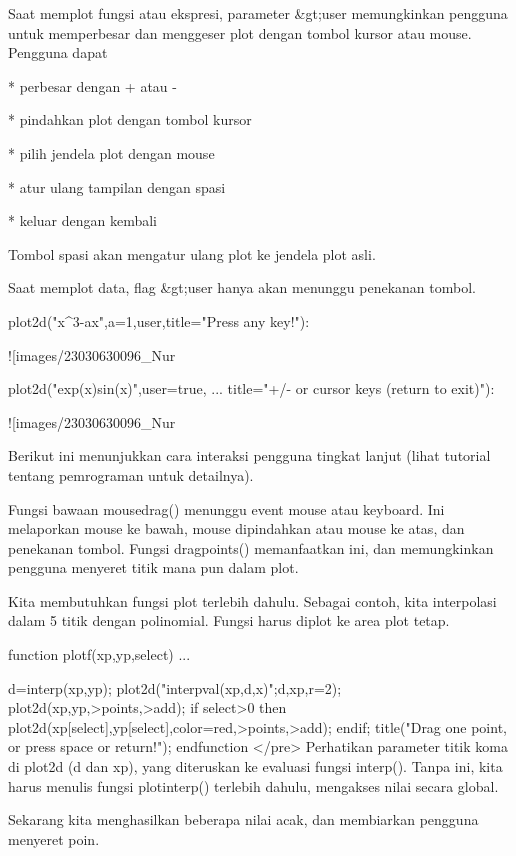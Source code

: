 \documentclass{article}
\begin{document}
Saat memplot fungsi atau ekspresi, parameter &gt;user memungkinkan
pengguna untuk memperbesar dan menggeser plot dengan tombol kursor
atau mouse. Pengguna dapat


* 
perbesar dengan + atau -

* 
pindahkan plot dengan tombol kursor

* 
pilih jendela plot dengan mouse

* 
atur ulang tampilan dengan spasi

* 
keluar dengan kembali


Tombol spasi akan mengatur ulang plot ke jendela plot asli.


Saat memplot data, flag &gt;user hanya akan menunggu penekanan tombol.


\>plot2d({{"x^3-a\*x",a=1}},\>user,title="Press any key!"):


![images/23030630096_Nur%

\>plot2d("exp(x)\*sin(x)",user=true, ...  
\>     title="+/- or cursor keys (return to exit)"):


![images/23030630096_Nur%

Berikut ini menunjukkan cara interaksi pengguna tingkat lanjut (lihat
tutorial tentang pemrograman untuk detailnya).


Fungsi bawaan mousedrag() menunggu event mouse atau keyboard. Ini
melaporkan mouse ke bawah, mouse dipindahkan atau mouse ke atas, dan
penekanan tombol. Fungsi dragpoints() memanfaatkan ini, dan
memungkinkan pengguna menyeret titik mana pun dalam plot.


Kita membutuhkan fungsi plot terlebih dahulu. Sebagai contoh, kita
interpolasi dalam 5 titik dengan polinomial. Fungsi harus diplot ke
area plot tetap.


\>function plotf(xp,yp,select) ...


      d=interp(xp,yp);
      plot2d("interpval(xp,d,x)";d,xp,r=2);
      plot2d(xp,yp,>points,>add);
      if select>0 then
        plot2d(xp[select],yp[select],color=red,>points,>add);
      endif;
      title("Drag one point, or press space or return!");
    endfunction
</pre>
Perhatikan parameter titik koma di plot2d (d dan xp), yang diteruskan
ke evaluasi fungsi interp(). Tanpa ini, kita harus menulis fungsi
plotinterp() terlebih dahulu, mengakses nilai secara global.


Sekarang kita menghasilkan beberapa nilai acak, dan membiarkan
pengguna menyeret poin.
\end{document}
